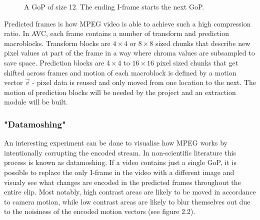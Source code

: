 \documentclass[11pt,english]{report}
\newcommand*{\angleframe}[7]{%
\begin{scope}[xshift  =#4, yshift = #5,
			every node/.append style = {yslant = #7},
			yslant = #7,
			local bounding box = #2]
\node[#1] at (#6,#6) {};
\node[label, yslant = -#7, above right=9em and -0.75em of #2.south east](#2-label) {#3};
\end{scope}
}
\begin{document}
\begin{figure}[!ht]
	\centering
	\caption{\centering A GoP of size 12. The ending I-frame starts the next GoP.}
\end{figure}

Predicted frames is how MPEG video is able to achieve such a high compression ratio. In AVC, each frame contains a number of transform and prediction macroblocks. Transform blocks are $4 \times 4$ or $8 \times 8$ sized chunks that describe new pixel values at part of the frame in a way where chroma values are subsampled to save space. Prediction blocks are $4 \times 4$ to $16 \times 16$ pixel sized chunks that get shifted across frames and motion of each macroblock is defined by a motion vector $\overrightarrow{v}$ - pixel data is reused and only moved from one location to the next. The motion of prediction blocks will be needed by the project and an extraction module will be built.

\subsubsection{"Datamoshing"}

An interesting experiment can be done to visualise how MPEG works by intentionally corrupting the encoded stream. In non-scientific literature this process is known as datamoshing. If a video contains just a single GoP, it is possible to replace the only I-frame in the video with a different image and visualy see what changes are encoded in the predicted frames throughout the entire clip. Most notably, high contrast areas are likely to be moved in accordance to camera motion, while low contrast areas are likely to blur themselves out due to the noisiness of the encoded motion vectors (see figure 2.2).
\end{document}
